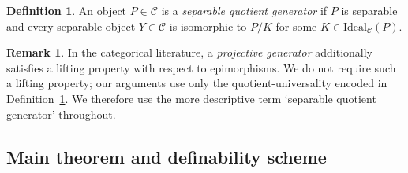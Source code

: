 \documentclass[12pt,fleqn,a4paper]{amsart}
\numberwithin{equation}{section}
\theoremstyle{definition}
\newtheorem{definition}[theorem]{Definition}
\newtheorem{remark}[theorem]{Remark}
\newcommand{\Ideal}{\mathrm{Ideal}}
\begin{document}
\begin{definition}\label{def:projective}
An object $P\in\mathcal C$ is a \emph{separable quotient generator} if
$P$ is separable and every separable object $Y\in\mathcal C$ is isomorphic to
$P/K$ for some $K\in\Ideal_{\mathcal C}(P)$.
\end{definition}

\begin{remark}\label{rem:terminology}
In the categorical literature, a \emph{projective generator} additionally satisfies
a lifting property with respect to epimorphisms.  We do not require such a lifting
property; our arguments use only the quotient-universality encoded in
Definition~\ref{def:projective}.  We therefore use the more descriptive term
`separable quotient generator' throughout.
\end{remark}

\subsection{Main theorem and definability scheme}
\end{document}
